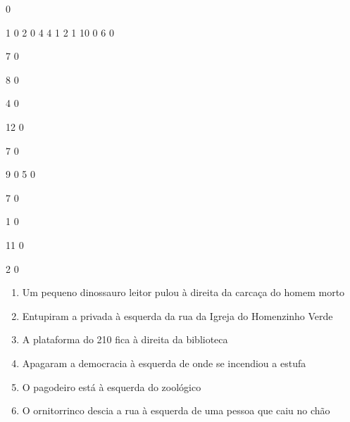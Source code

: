 \documentclass[12pt]{article}
\begin{document}
		\vfill  
		  
{
	0	%

	1	%
	0	%
	2	%
	0	%
	4	%
	4	%
	1	%
	2	%
	1	%
	10	%
	0	%
	6	%
	0	%

	7	%
	0	%

	8	%
	0	%

	4	%
	0	%

	12	%
	0	%

	7	%
	0	%

	9	%
	0	%
	5	%
	0	%

	7	%
	0	%

	1	%
	0	%

	11	%
	0	%

	2	%
	0	%

}	  
		    	

		 

\pagebreak


	\begin{enumerate}
		  \sffamily %
		  \large %


\vfill \item
Um pequeno dinossauro leitor pulou	%
à direita
da carcaça do homem morto	%

\vfill \item
Entupiram a privada	%
à esquerda
da rua da Igreja do Homenzinho Verde	%

\vfill \item
A plataforma do 210 fica	%
à direita
da biblioteca	%

\vfill \item
Apagaram a democracia	%
à esquerda
de onde se incendiou a estufa	%

\vfill \item
O pagodeiro está	%
à esquerda
do zoológico	%

\vfill \item
O ornitorrinco descia a rua	%
à esquerda
de uma pessoa que caiu no chão	%
	\end{enumerate}
		  
		  \hfill

		  \vfill
\end{document}
